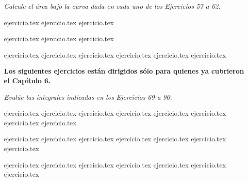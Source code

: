 \vspace{1em}
\noindent \textit{Calcule el área bajo la curva dada en cada uno de los Ejercicios 57 a 62.}

\begin{enumerate}
    \setcounter{enumi}{56}
    \begin{minipage}{0.45\textwidth}
    {ejercicio.tex}
    {ejercicio.tex}
    {ejercicio.tex}
    \end{minipage}%
    \begin{minipage}{0.45\textwidth}
    {ejercicio.tex}
    {ejercicio.tex}
    {ejercicio.tex}
    \end{minipage}
\end{enumerate}

\vspace{1em}
\begin{enumerate}
    \setcounter{enumi}{62}
    {ejercicio.tex}
    {ejercicio.tex}
    {ejercicio.tex}
    {ejercicio.tex}
    {ejercicio.tex}
    {ejercicio.tex}
\end{enumerate}

\vspace{2em}
\noindent \textbf{\large Los siguientes ejercicios están dirigidos sólo para quienes ya cubrieron el Capítulo 6.}

\vspace{1em}
\noindent \textit{Evalúe las integrales indicadas en los Ejercicios 69 a 90.}

\begin{enumerate}
    \setcounter{enumi}{68}
    \begin{minipage}{0.3\textwidth}
    {ejercicio.tex}
    {ejercicio.tex}
    {ejercicio.tex}
    {ejercicio.tex}
    {ejercicio.tex}
    {ejercicio.tex}
    {ejercicio.tex}
    {ejercicio.tex}
    \end{minipage}%
    \begin{minipage}{0.3\textwidth}
    {ejercicio.tex}
    {ejercicio.tex}
    {ejercicio.tex}
    {ejercicio.tex}
    {ejercicio.tex}
    {ejercicio.tex}
    {ejercicio.tex}
    \end{minipage}%
    \begin{minipage}{0.3\textwidth}
    {ejercicio.tex}
    {ejercicio.tex}
    {ejercicio.tex}
    {ejercicio.tex}
    {ejercicio.tex}
    {ejercicio.tex}
    {ejercicio.tex}
    \end{minipage}
\end{enumerate}


